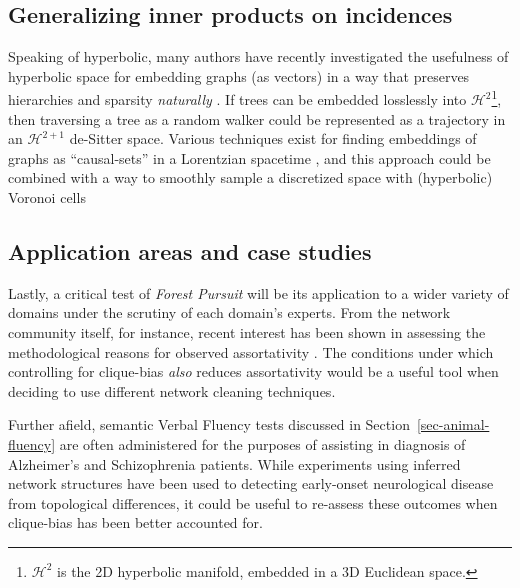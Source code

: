\documentclass[%
	12pt,
		oneside,
		letterpaper
]{book}
\begin{document}
\subsection{Generalizing inner products on
incidences}\label{sec-future-hyperbolic}

Speaking of hyperbolic, many authors have recently investigated the
usefulness of hyperbolic space for embedding graphs (as vectors) in a
way that preserves hierarchies and sparsity \emph{naturally}
\autocite{TreesContinuousEmbeddings_Chami2020,HyperbolicEntailmentCones_Ganea2018,LearningContinuousHierarchies_Nickel2018,RepresentationTradeoffsHyperbolic_Sala2018,Socialcentralizationsemantic_Linzhuo2020}.
If trees can be embedded losslessly
\autocite{LowDistortionDelaunay_Sarkar2012} into
\(\mathcal{H}^2\)\footnote{ \(\mathcal{H}^2\) is the 2D hyperbolic
  manifold, embedded in a 3D Euclidean space.}, then traversing a tree
as a random walker could be represented as a trajectory in an
\(\mathcal{H}^{2+1}\) de-Sitter space. Various techniques exist for
finding embeddings of graphs as ``causal-sets'' in a Lorentzian
spacetime \autocite{EmbeddinggraphsLorentzian_Clough2017}, and this
approach could be combined with a way to smoothly sample a discretized
space with (hyperbolic) Voronoi cells
\autocite{HyperbolicVoronoiDiagrams_Nielsen2010,SemiDiscreteNormalizing_Chen2022}

\subsection{Application areas and case
studies}\label{application-areas-and-case-studies}

Lastly, a critical test of \emph{Forest Pursuit} will be its application
to a wider variety of domains under the scrutiny of each domain's
experts. From the network community itself, for instance, recent
interest has been shown in assessing the methodological reasons for
observed assortativity
\autocite{PerceivedAssortativitySocial_Fisher2017}. The conditions under
which controlling for clique-bias \emph{also} reduces assortativity
would be a useful tool when deciding to use different network cleaning
techniques.

Further afield, semantic Verbal Fluency tests discussed in
Section~\ref{sec-animal-fluency} are often administered for the purposes
of assisting in diagnosis of Alzheimer's and Schizophrenia patients.
While experiments using inferred network structures
\autocite{newdissimilaritymeasure_Prescott2006,Semanticverbalfluency_AriasTrejo2021}
have been used to detecting early-onset neurological disease from
topological differences, it could be useful to re-assess these outcomes
when clique-bias has been better accounted for.
\end{document}
